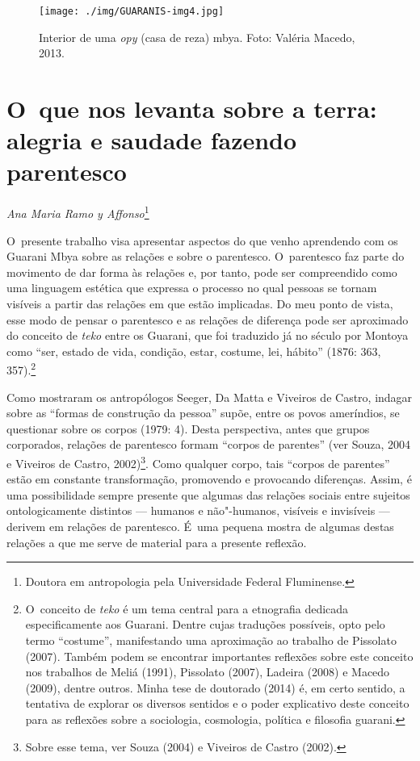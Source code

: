 \begin{figure}
  \centering
 \texttt{[image: ./img/GUARANIS-img4.jpg]}	
  \hfill
  \caption{Interior de uma \emph{opy} (casa de reza) mbya. Foto: Valéria Macedo, 2013.}
\end{figure}


\chapter{O~que nos levanta sobre a terra: alegria e saudade fazendo
parentesco}
\@openrighttrue\makeatother
\begin{flushright}
\emph{Ana Maria Ramo y Affonso}\footnote{Doutora em antropologia pela
Universidade Federal Fluminense.}
\end{flushright}

\noindent
O~presente trabalho visa apresentar aspectos do que venho aprendendo com
os Guarani Mbya sobre as relações e sobre o parentesco. O~parentesco
faz parte do movimento de dar forma às relações e, por tanto, pode ser
compreendido como uma linguagem estética que expressa o processo no
qual pessoas se tornam visíveis a partir das relações em que estão
implicadas. Do meu ponto de vista, esse modo de pensar o parentesco e
as relações de diferença pode ser aproximado do conceito de \emph{teko} entre
os Guarani, que foi traduzido já no século  por Montoya como ``ser,
estado de vida, condição, estar, costume, lei, hábito'' (1876: 363,
357).\footnote{O~conceito de \emph{teko} é um tema central para a etnografia
dedicada especificamente aos Guarani. Dentre cujas traduções possíveis,
opto pelo termo ``costume'', manifestando uma aproximação ao trabalho de
Pissolato (2007). Também podem se encontrar importantes reflexões sobre
este conceito nos trabalhos de Meliá (1991), Pissolato (2007), Ladeira
(2008) e Macedo (2009), dentre outros. Minha tese de doutorado (2014)
é, em certo sentido, a tentativa de explorar os diversos sentidos e o
poder explicativo deste conceito para as reflexões sobre a sociologia,
cosmologia, política e filosofia guarani.}

Como mostraram os antropólogos Seeger, Da Matta e Viveiros de Castro,
indagar sobre as ``formas de construção da pessoa'' supõe, entre os povos
ameríndios, se questionar sobre os corpos (1979: 4). Desta perspectiva,
antes que grupos corporados, relações de parentesco formam ``corpos de
parentes'' (ver Souza, 2004 e Viveiros de Castro, 2002)\footnote{Sobre
esse tema, ver Souza (2004) e Viveiros de Castro (2002).}. Como
qualquer corpo, tais ``corpos de parentes'' estão em constante
transformação, promovendo e provocando diferenças. Assim, é uma
possibilidade sempre presente que algumas das relações sociais entre
sujeitos ontologicamente distintos --- humanos e não"-humanos, visíveis e
invisíveis --- derivem em relações de parentesco. É~uma pequena mostra de
algumas destas relações a que me serve de material para a presente
reflexão.

